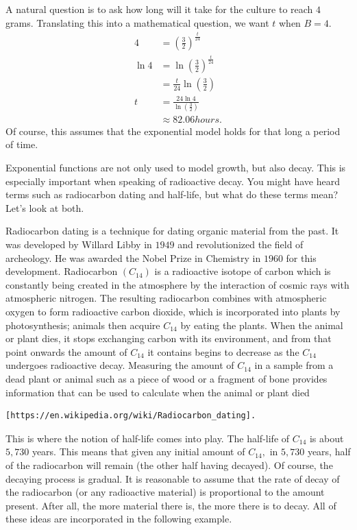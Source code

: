 A natural question is to ask how long
will it take for the culture to reach $4$ grams.  Translating this into
a mathematical question, we want $t$ when $B=4.$ 
\begin{align*}
  4&=\left(\frac{3}{2}\right)^{\frac{t}{24}}\\
 \ln 4&=\ln \left(\frac{3}{2}\right)^{\frac{t}{24}}  \\
 &=\frac{t}{24} \ln \left(\frac{3}{2}\right) \\
t&=\frac{24  \ln 4}{\ln \left(\frac{3}{2}\right)}\\
 &\approx 82.06 hours.
\end{align*}
Of course, this assumes that the exponential model holds for that long
a period of time. 

Exponential functions are not only used to model growth, but also
decay.  This is especially important when speaking of radioactive
decay.  You might have heard terms such as radiocarbon dating and
half-life, but what do these terms mean?  Let's look at both.

Radiocarbon dating is a technique for dating organic material from the
past.  It was developed by Willard Libby in $1949$ and revolutionized
the field of archeology.  He was awarded the Nobel Prize in Chemistry
in $1960$ for this development. Radiocarbon $(C_{14})$ is a
radioactive isotope of carbon which is constantly being created in the
atmosphere by the interaction of cosmic rays with atmospheric
nitrogen. The resulting radiocarbon combines with atmospheric oxygen
to form radioactive carbon dioxide, which is incorporated into plants
by photosynthesis; animals then acquire $C_{14}$ by eating the
plants. When the animal or plant dies, it stops exchanging carbon with
its environment, and from that point onwards the amount of $C_{14}$ it
contains begins to decrease as the $C_{14}$ undergoes radioactive
decay. Measuring the amount of $C_{14}$ in a sample from a dead plant
or animal such as a piece of wood or a fragment of bone provides
information that can be used to calculate when the animal or plant
died
\begin{verbatim}
[https://en.wikipedia.org/wiki/Radiocarbon_dating].
\end{verbatim}


This is where the notion of half-life comes into play.  The half-life
of $C_{14}$ is about $5,730$ years.  This means that given any initial
amount of $C_{14},$ in $5,730$ years, half of the radiocarbon will
remain (the other half having decayed).  Of course, the decaying
process is gradual.  It is reasonable to assume that the rate of decay
of the radiocarbon (or any radioactive material) is proportional to
the amount present.  After all, the more material there is, the more
there is to decay.  All of these ideas are incorporated in the
following example.

